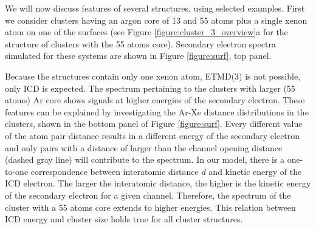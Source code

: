 We will now discuss features of several structures, using selected examples.
First we consider clusters having an argon core of 13 and 55 atoms plus a single xenon
atom on one of the surfaces (see Figure \ref{figure:cluster_3_overview}a
for the structure of clusters with the 55 atoms core).
Secondary electron spectra simulated for these systems are shown in Figure \ref{figure:surf}, top panel.

Because the structures contain only one xenon atom, ETMD(3) is not possible, only ICD is expected. 
The spectrum pertaining to the clusters with larger (55 atoms) Ar core shows
signals at higher energies of the secondary electron. These features
can be explained by investigating the Ar-Xe distance distributions
in the clusters, shown
in the bottom panel of Figure \ref{figure:surf}. 
Every different value of the atom pair distance
results in a different energy of the secondary electron and only pairs
with a distance of larger than the channel opening distance
(dashed gray line) will contribute
to the spectrum. 
In our model, there is a one-to-one correspondence between interatomic distance $d$ and kinetic energy of the ICD electron.
The larger the interatomic distance, the higher is the
kinetic energy of the secondary electron for a given channel.
Therefore, the spectrum of the cluster with a 55 atoms core extends to higher energies.
This relation between ICD energy and cluster size holds true for all cluster structures.

